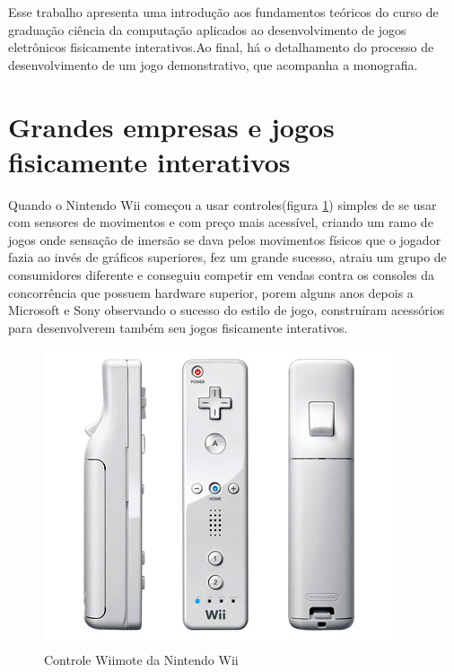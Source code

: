 Esse trabalho apresenta uma introdução aos fundamentos teóricos do curso de graduação ciência da computação aplicados ao desenvolvimento de jogos eletrônicos
fisicamente interativos.Ao final, há o detalhamento do processo de desenvolvimento de um jogo demonstrativo, que acompanha a monografia.

\section{Grandes empresas e jogos fisicamente interativos}

Quando o Nintendo Wii começou a usar controles(figura \ref{wiimote}) simples de se usar com sensores de movimentos e com preço mais acessível, criando um ramo de jogos onde sensação
de imersão se dava pelos movimentos físicos que o jogador fazia ao invés de gráficos superiores, fez um grande sucesso, atraiu um grupo de consumidores diferente
e conseguiu competir em vendas contra os consoles  da concorrência que possuem hardware superior, porem alguns anos depois a Microsoft e Sony observando o sucesso
do estilo de jogo, construíram acessórios para desenvolverem também seu jogos fisicamente interativos.

\begin{figure}[h]
    \center
    \includegraphics[scale=0.45]{imagens/wiimote.jpg}

    \caption{Controle Wiimote da Nintendo Wii}
    \label{wiimote}
\end{figure}

